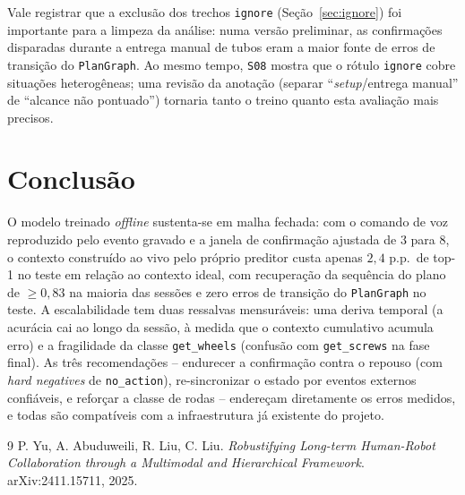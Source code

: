 \documentclass[11pt]{article}
\begin{document}
Vale registrar que a exclusão dos trechos \texttt{ignore}
(Seção~\ref{sec:ignore}) foi importante para a limpeza da análise: numa versão
preliminar, as confirmações disparadas durante a entrega manual de tubos eram a
maior fonte de erros de transição do \texttt{PlanGraph}. Ao mesmo tempo,
\texttt{S08} mostra que o rótulo \texttt{ignore} cobre situações heterogêneas;
uma revisão da anotação (separar ``\emph{setup}/entrega manual'' de ``alcance
não pontuado'') tornaria tanto o treino quanto esta avaliação mais precisos.

\section{Conclusão}
\label{sec:conclusao}

O modelo treinado \emph{offline} sustenta-se em malha fechada: com o comando de
voz reproduzido pelo evento gravado e a janela de confirmação ajustada de 3 para
8, o contexto construído ao vivo pelo próprio preditor custa apenas $2{,}4$ p.p.\
de top-1 no teste em relação ao contexto ideal, com recuperação da sequência do
plano de $\ge 0{,}83$ na maioria das sessões e zero erros de transição do
\texttt{PlanGraph} no teste. A escalabilidade tem duas ressalvas mensuráveis: uma
deriva temporal (a acurácia cai ao longo da sessão, à medida que o contexto
cumulativo acumula erro) e a fragilidade da classe \texttt{get\_wheels} (confusão
com \texttt{get\_screws} na fase final). As três recomendações -- endurecer a
confirmação contra o repouso (com \emph{hard negatives} de \texttt{no\_action}),
re-sincronizar o estado por eventos externos confiáveis, e reforçar a classe de
rodas -- endereçam diretamente os erros medidos, e todas são compatíveis com a
infraestrutura já existente do projeto.

\begin{thebibliography}{9}
P. Yu, A. Abuduweili, R. Liu, C. Liu.
\emph{Robustifying Long-term Human-Robot Collaboration through a
Multimodal and Hierarchical Framework}.
arXiv:2411.15711, 2025.
\end{thebibliography}
\end{document}
